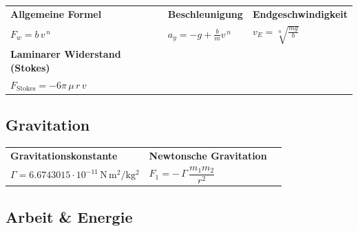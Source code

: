 \documentclass[10pt,a4paper]{article}
\begin{document}
		\begin{tabular}{p{} p{} p{}}
			
			\textbf{Allgemeine Formel} &
			\textbf{Beschleunigung} &
			\textbf{Endgeschwindigkeit}
			\\[6pt]
			
			$F_w = b\, v^{\,n}$ &
			$a_y = -g + \frac{b}{m} v^{\,n}$ &
			$v_E = \sqrt[n]{\frac{mg}{b}}$
			\\[14pt]
			
			\textbf{Laminarer Widerstand (Stokes)} & & 
			\\[6pt]
			
			$F_{\text{Stokes}} = -6\pi\, \mu\, r\, v$ & &
			\\
			
		\end{tabular}
		
		\subsection{Gravitation}
		
		\begin{tabular}{p{} p{} p{}}
			
			\textbf{Gravitationskonstante} &
			\textbf{Newtonsche Gravitation} &
			\\[6pt]
			
			$\Gamma = 6.6743015 \cdot 10^{-11}\,\mathrm{N\, m^2 / kg^2}$ &
			$F_1 = -\,\Gamma\, \dfrac{m_1 m_2}{r^2}$ &
			\\
			
		\end{tabular}
		
		\subsection{Arbeit \& Energie}
		
\end{document}

